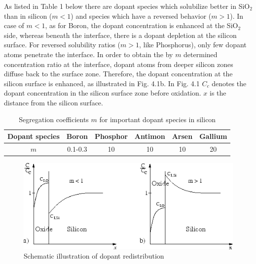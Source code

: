 \documentclass[10pt,a4paper,oneside]{article}
\begin{document}
As listed in Table 1 below there are dopant species which solubilize better in SiO$ _2$ than in silicon ($ m < 1$) and species which have a reversed behavior ($ m > 1$).
In case of $ m < 1$, as for Boron, the dopant concentration is enhanced at the SiO$ _2$ side, whereas beneath the interface, there is a dopant depletion at the silicon surface.
For reversed solubility ratios ($ m > 1$, like Phosphorus), only few dopant atoms penetrate the interface.
In order to obtain the by $ m$ determined concentration ratio at the interface, dopant atoms from deeper silicon zones diffuse back to the surface zone.
Therefore, the dopant concentration at the silicon surface is enhanced, as illustrated in Fig. 4.1b.
In Fig. 4.1 $ C_c$ denotes the dopant concentration in the silicon surface zone before oxidation. $ x$ is the distance from the silicon surface.

\begin{center}
	\begin{table}
		\begin{tabular}{|c|c|c|c|c|c|}
			\hline
			Dopant species &
			Boron &
			Phosphor &
			Antimon &
			Arsen &
			Gallium \\
			\hline
			$m$ &
			0.1-0.3 &
			10 &
			10 &
			10 &
			20 \\
			\hline
		\end{tabular}
		\caption{Segregation coefficients $m$ for important dopant species in silicon}
	\end{table}
\end{center}

\begin{center}
	\begin{figure}[h]
		\begin{center}
			\includegraphics[width=0.75\linewidth]{img349.png}
		\end{center}
		\caption{Schematic illustration of dopant redistribution}
	\end{figure}
\end{center}

\end{document}
